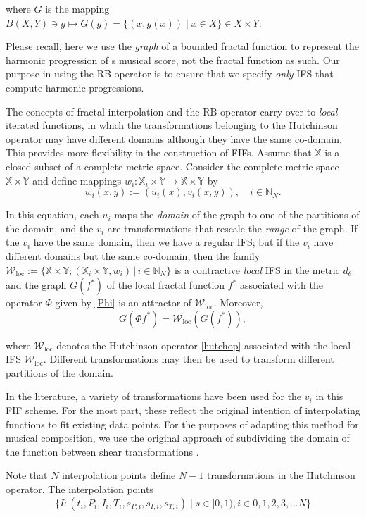 \documentclass[english,11pt,letterpaper,onecolumn]{scrartcl}
\numberwithin{equation}{section}
\newcommand{\st}{\,|\,}
\newcommand{\N}{\mathbb{N}}
\newcommand{\X}{\mathbb{X}}
\newcommand{\Y}{\mathbb{Y}}
\newcommand{\cW}{\mathcal{W}}
\newcommand{\be}{\begin{equation}}
\newcommand{\ee}{\end{equation}}
\newcommand{\loc}{\mathrm{loc}}
\begin{document}
\noindent where $G$ is the mapping $B(X,Y)\ni g\longmapsto G(g) = \{(x,
g(x))\mid x\in X\}\in X\times Y$.

Please recall, here we use the \textit{graph} of a bounded fractal function to
represent the harmonic progression of s musical score, not the fractal function
as such. Our purpose in using the RB operator is to ensure that we specify
\textit{only} IFS that compute harmonic progressions.

The concepts of fractal interpolation and the RB operator carry over to
\textit{local} iterated functions, in which the transformations belonging to the
Hutchinson operator may have different domains although they have the same
co-domain. This provides more flexibility in the construction of FIFs. Assume
that $\X$ is a closed subset of a complete metric space. Consider the complete
metric space $\X\times\Y$ and define mappings $w_i:\X_i\times\Y\to\X\times\Y$ by
\be\label{IfsForFif}
w_i (x, y) := (u_i (x), v_i (x,y)), \quad i\in \N_N.
\ee

In this equation, each $u_i$ maps the \emph{domain} of the graph to one of the
partitions of the domain, and the $v_i$ are transformations that rescale
the \emph{range} of the graph. If the $v_i$ have the same domain, then we have a
regular IFS; but if the $v_i$ have different domains but the same co-domain,
then the family $\cW_\loc := \{\X\times\Y; (\X_i\times\Y, w_i)\st i\in \N_N\}$
is a contractive \textit{local} IFS in the metric $d_\theta$ and the graph
$G(f^*)$ of the local fractal function $f^*$ associated with the operator $\Phi$
given by \eqref{Phi} is an attractor of $\cW_\loc$. Moreover,
\be\label{GW}
G(\Phi f^*) = \cW_\loc (G(f^*)),
\ee

\noindent where $\cW_\loc$ denotes the Hutchinson operator \eqref{hutchop}
associated with the local IFS $\cW_\loc$. Different transformations may then be
used to transform different partitions of the domain.

In the literature, a variety of transformations have been used for the $v_i$ in
this FIF scheme. For the most part, these reflect the original intention of
interpolating functions to fit existing data points. For the purposes of
adapting this method for musical composition, we use the original approach of
subdividing the domain of the function between shear transformations
\cite{navascues2014fractal}.

Note that $N$ interpolation points define $N-1$ transformations in the
Hutchinson operator. The interpolation points
\be\label{interpolationPoints}\{I : (t_i, P_i, I_i, T_i,
s_{P,i}, s_{I,i}, s_{T,i}) \mid s \in [0, 1), i \in 0, 1, 2, 3, \dots N \}
\ee
\end{document}
